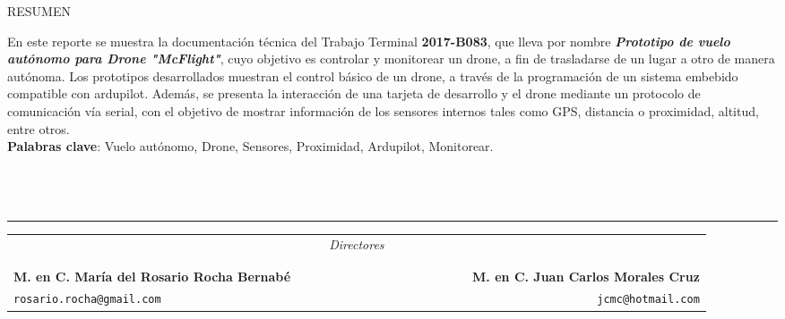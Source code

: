 %
\begin{center}
	\Large \textsc{RESUMEN}
\end{center}

 
En este reporte se muestra la documentación técnica del Trabajo Terminal 
\textbf{2017-B083}, que lleva por nombre \textit{
\textbf{Prototipo de vuelo autónomo para Drone "McFlight"}}, cuyo objetivo es controlar y 
monitorear un drone, a fin de trasladarse de un lugar a otro de manera autónoma. 
Los prototipos desarrollados muestran el control básico de un drone, a través de 
la programación de un sistema embebido compatible con ardupilot. Además, se 
presenta la interacción de una tarjeta de desarrollo y el drone mediante un 
protocolo de comunicación vía serial, con el objetivo de mostrar información de los sensores 
internos tales como GPS, distancia o proximidad, altitud, entre otros. \\


\textbf{Palabras clave}: Vuelo autónomo, Drone, Sensores, Proximidad, Ardupilot, 
Monitorear. 
\\ \\ \\ \\

\vspace{5pt}
\hrule
\vspace{6pt}

\begin{table}[H]
	\centering
	\label{tab:directores}
	\begin{tabular}{lcccccccccr}
		\multicolumn{11}{c}{\Large \textit{Directores}} \\ \\ \\
		\textbf{M. en C. María del Rosario Rocha Bernabé} & \ & \ & \ & \ & \ & \ 
		& \ & \ & \ & \textbf{M. en C. Juan Carlos Morales Cruz} \\
		\texttt{rosario.rocha@gmail.com}         & \ & \ & \ & \ & \ & \ 
		& \ & \ & \ & \texttt{jcmc@hotmail.com}
	\end{tabular}
\end{table}

